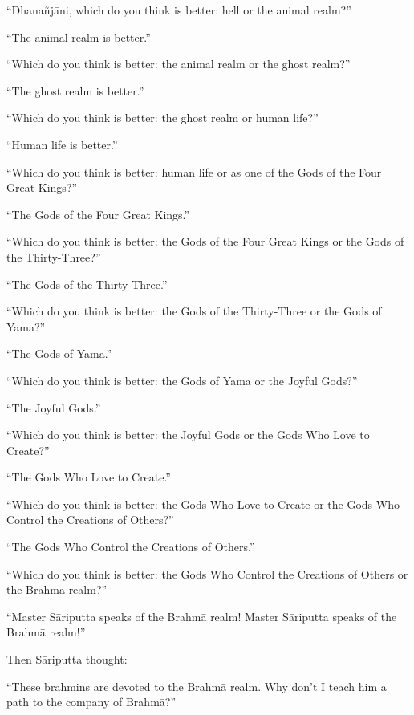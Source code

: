 \documentclass[12pt,openany]{book}%
\begin{document}
“\textsanskrit{Dhanañjāni}, which do you think is better: hell or the animal realm?” 

“The animal realm is better.” 

“Which do you think is better: the animal realm or the ghost realm?” 

“The ghost realm is better.” 

“Which do you think is better: the ghost realm or human life?” 

“Human life is better.” 

“Which do you think is better: human life or as one of the Gods of the Four Great Kings?” 

“The Gods of the Four Great Kings.” 

“Which do you think is better: the Gods of the Four Great Kings or the Gods of the Thirty-Three?” 

“The Gods of the Thirty-Three.” 

“Which do you think is better: the Gods of the Thirty-Three or the Gods of Yama?” 

“The Gods of Yama.” 

“Which do you think is better: the Gods of Yama or the Joyful Gods?” 

“The Joyful Gods.” 

“Which do you think is better: the Joyful Gods or the Gods Who Love to Create?” 

“The Gods Who Love to Create.” 

“Which do you think is better: the Gods Who Love to Create or the Gods Who Control the Creations of Others?” 

“The Gods Who Control the Creations of Others.” 

“Which do you think is better: the Gods Who Control the Creations of Others or the \textsanskrit{Brahmā} realm?” 

“Master \textsanskrit{Sāriputta} speaks of the \textsanskrit{Brahmā} realm! Master \textsanskrit{Sāriputta} speaks of the \textsanskrit{Brahmā} realm!” 

Then \textsanskrit{Sāriputta} thought: 

“These brahmins are devoted to the \textsanskrit{Brahmā} realm. Why don’t I teach him a path to the company of \textsanskrit{Brahmā}?” 
\end{document}
